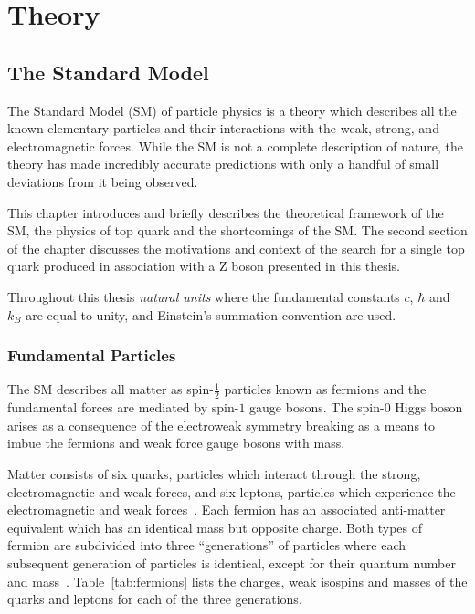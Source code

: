 \chapter{Theory}\label{chapter:theory}
\section{The Standard Model}\label{sec:sm}
The Standard Model (SM) of particle physics is a theory which describes all the known elementary particles and their interactions with the weak, strong, and electromagnetic forces.
While the SM is not a complete description of nature, the theory has made incredibly accurate predictions with only a handful of small deviations from it being observed.

This chapter introduces and briefly describes the theoretical framework of the SM, the physics of top quark and the shortcomings of the SM.
The second section of the chapter discusses the motivations and context of the search for a single top quark produced in association with a Z boson presented in this thesis.

Throughout this thesis \emph{natural units} where the fundamental constants $c$, $\hbar$ and $k_{B}$ are equal to unity, and Einstein's summation convention are used.

\subsection{Fundamental Particles}\label{subsec:particles}
The SM describes all matter as spin-$\frac{1}{2}$ particles known as fermions and the fundamental forces are mediated by spin-$1$ gauge bosons.
The spin-$0$ Higgs boson arises as a consequence of the electroweak symmetry breaking as a means to imbue the fermions and weak force gauge bosons with mass.

Matter consists of six quarks, particles which interact through the strong, electromagnetic and weak forces, and six leptons, particles which experience the electromagnetic and weak forces~\cite{LagrangiansSM}.
Each fermion has an associated anti-matter equivalent which has an identical mass but opposite charge.
Both types of fermion are subdivided into three ``generations'' of particles where each subsequent generation of particles is identical, except for their quantum number and mass~\cite{ElectroweakStrong}.
Table~\ref{tab:fermions} lists the charges, weak isospins and masses of the quarks and leptons for each of the three generations.

